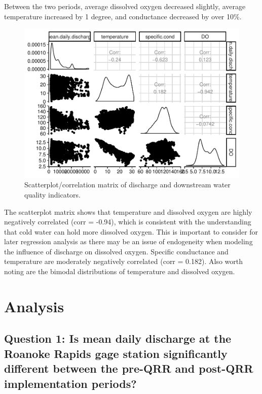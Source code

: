 \documentclass[12pt,]{article}
\begin{document}
Between the two periods, average dissolved oxygen decreased slightly,
average temperature increased by 1 degree, and conductance decreased by
over 10\%.

\begin{figure}
\centering
\includegraphics{Project_Template_files/figure-latex/unnamed-chunk-6-1.pdf}
\caption{Scatterplot/correlation matrix of discharge and downstream
water quality indicators.}
\end{figure}

The scatterplot matrix shows that temperature and dissolved oxygen are
highly negatively correlated (corr = -0.94), which is consistent with
the understanding that cold water can hold more dissolved oxygen. This
is important to consider for later regression analysis as there may be
an issue of endogeneity when modeling the influence of discharge on
dissolved oxygen. Specific conductance and temperature are moderately
negatively correlated (corr = 0.182). Also worth noting are the bimodal
distributions of temperature and dissolved oxygen.

\newpage

\hypertarget{analysis}{%
\section{Analysis}\label{analysis}}

\hypertarget{question-1-is-mean-daily-discharge-at-the-roanoke-rapids-gage-station-significantly-different-between-the-pre-qrr-and-post-qrr-implementation-periods}{%
\subsection{Question 1: Is mean daily discharge at the Roanoke Rapids
gage station significantly different between the pre-QRR and post-QRR
implementation
periods?}\label{question-1-is-mean-daily-discharge-at-the-roanoke-rapids-gage-station-significantly-different-between-the-pre-qrr-and-post-qrr-implementation-periods}}
\end{document}
